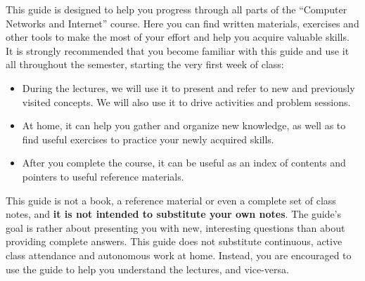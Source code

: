 This guide is designed to help you progress through all parts of the ``Computer Networks and Internet'' course.
Here you can find written materials, exercises and other tools to make the most of your effort and help you acquire
valuable skills. It is strongly recommended that you become familiar with this guide and use it all throughout the semester, starting
the very first week of class:

\begin{itemize}
\item During the lectures, we will use it to present and refer to new and previously visited concepts. 
      We will also use it to drive activities and problem sessions.\\[-0.3cm]
      
\item At home, it can help you gather and organize new knowledge, as well as to find useful exercises to practice
      your newly acquired skills.\\[-0.3cm]
      
\item After you complete the course, it can be useful as an index of contents and pointers to useful reference materials.
\end{itemize}

\begin{remark}
This guide is not a book, a reference material or even a complete set of class notes, and
\textbf{it is not intended to substitute your own notes}. 
The guide's goal is rather about presenting you with new, interesting questions than about providing complete answers.
This guide does not substitute continuous, active class attendance and autonomous work at home.
Instead, you are encouraged to use the guide to help you understand the lectures, and vice-versa.
\end{remark}



 
